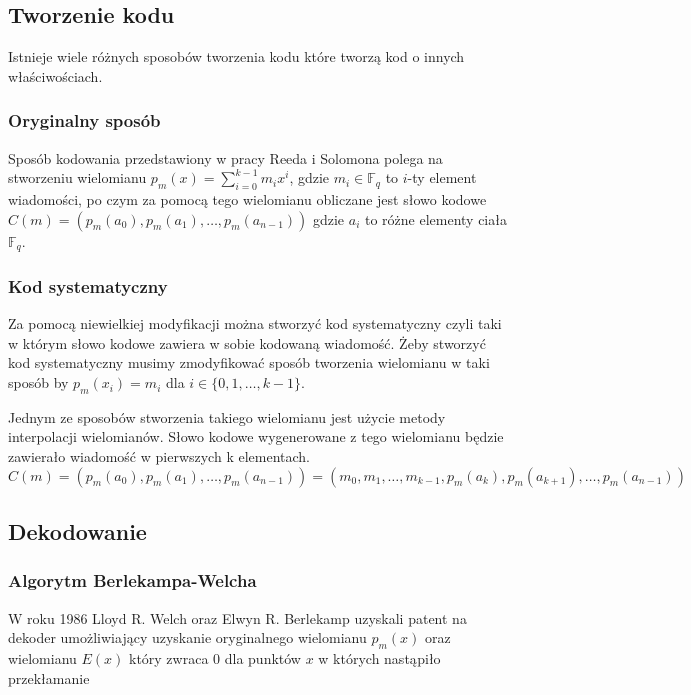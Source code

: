 \subsection{Tworzenie kodu}
Istnieje wiele różnych sposobów tworzenia kodu które tworzą kod o innych właściwościach.


\subsubsection{Oryginalny sposób}
Sposób kodowania przedstawiony w pracy Reeda i Solomona polega na stworzeniu wielomianu $p_m(x)=\sum_{i=0}^{k-1}m_{i}x^i$, gdzie $m_i\in\mathbb{F}_q$ to $i$\nobreakdash-ty element wiadomości, po czym za pomocą tego wielomianu obliczane jest słowo kodowe $C(m)=(p_m(a_0), p_m(a_1), \ldots, p_m(a_{n-1}))$ gdzie $a_i$ to różne elementy ciała $\mathbb{F}_q$.

\subsubsection{Kod systematyczny}
Za pomocą niewielkiej modyfikacji można stworzyć kod systematyczny czyli taki w którym słowo kodowe zawiera w sobie kodowaną wiadomość.
Żeby stworzyć kod systematyczny musimy zmodyfikować sposób tworzenia wielomianu w taki sposób by $p_m(x_i)=m_i$ dla $i \in \{0,1,\ldots,k-1\}$.

Jednym ze sposobów stworzenia takiego wielomianu jest użycie metody interpolacji wielomianów. Słowo kodowe wygenerowane z tego wielomianu będzie zawierało wiadomość w pierwszych k elementach.
\[C(m)=(p_m(a_0), p_m(a_1), \ldots, p_m(a_{n-1}))=(m_0, m_1, \ldots, m_{k-1}, p_m(a_k), p_m(a_{k+1}), \ldots, p_m(a_{n-1}))\]

\subsection{Dekodowanie}
\subsubsection{Algorytm Berlekampa-Welcha}
W roku 1986 Lloyd R. Welch oraz Elwyn R. Berlekamp uzyskali patent na dekoder umożliwiający uzyskanie oryginalnego wielomianu $p_m(x)$ oraz wielomianu $E(x)$ który zwraca 0 dla punktów $x$ w których nastąpiło przekłamanie~\cite{Berlekamp-Welch}
